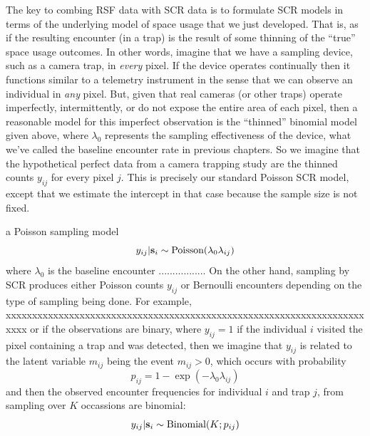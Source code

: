 The key to combing RSF data with SCR data is to formulate SCR models
in terms of the underlying model of space usage that we just
developed. That is, as if the resulting encounter (in a trap) is the
result of some thinning of the ``true'' space usage outcomes.
In other words, imagine that we have a sampling device, such as a
camera trap, in {\it every} pixel. If the device operates continually
then it functions similar to a telemetry instrument in the sense that
we can observe an individual in {\it any} pixel. But, given that 
real cameras (or other traps) operate imperfectly, intermittently, or do not expose the
entire area of each pixel, then a reasonable model for this imperfect
observation is the ``thinned'' binomial model given above, where
$\lambda_{0}$ represents the sampling
effectiveness of the device, what we've called the baseline encounter
rate in previous chapters. So we imagine that the hypothetical
perfect data from a camera trapping study are the thinned counts
$y_{ij}$ for every pixel $j$.
This is precisely our standard Poisson SCR model, except that we
estimate the intercept 
in that case because the sample size is not fixed.

a Poisson sampling model
\[
y_{ij}|{\bf s}_{i} \sim \mbox{Poisson}(\lambda_{0} \lambda_{ij})
\]
where $\lambda_{0}$ is the baseline encounter 
.................
On the other hand, sampling by SCR produces either Poisson counts $y_{ij}$ or Bernoulli
encounters depending on the type of sampling being done. For example,
xxxxxxxxxxxxxxxxxxxxxxxxxxxxxxxxxxxxxxxxxxxxxxxxxxxxxxxxxxxxxxxxxxxxxxxx
or if the observations are binary,
where $y_{ij} = 1$ if the individual $i$ visited
the pixel containing a trap and was detected, then we imagine that
$y_{ij}$ is related to the latent variable $m_{ij}$ being the event
$m_{ij}>0$, which occurs with probability
\[
 p_{ij} = 1-\exp(- \lambda_{0} \lambda_{ij})
\]
and then the observed encounter frequencies for individual $i$ and trap $j$, from
sampling over $K$ occassions are binomial:
\[
 y_{ij}|{\bf s}_{i} \sim \mbox{Binomial}(K; p_{ij})
\]

